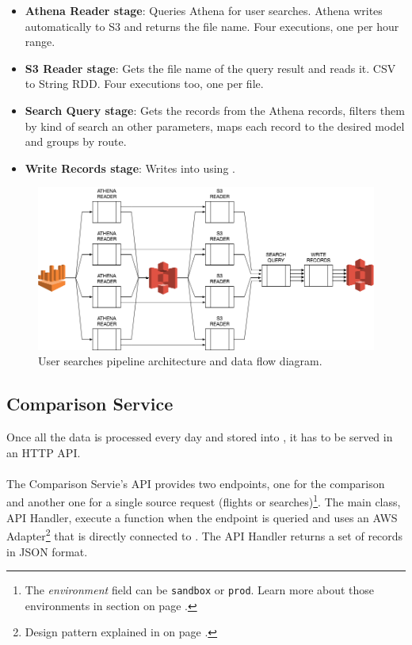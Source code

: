 \begin{itemize}
    \item \textbf{Athena Reader stage}: Queries Athena for user searches. Athena writes automatically to S3 and returns the file name. Four executions, one per hour range.
    \item \textbf{S3 Reader stage}: Gets the file name of the query result and reads it. CSV\cite{csv} to String RDD. Four executions too, one per file.
    \item \textbf{Search Query stage}: Gets the records from the Athena records, filters them by kind of search an other parameters, maps each record to the desired model and groups by route.
    \item \textbf{Write Records stage}: Writes into  using .
\end{itemize}

\begin{figure}[H]
\centering
\includegraphics[scale=0.45]{diagrams/user-searches-pipeline-architecture.png}
\caption{User searches pipeline architecture and data flow diagram.}
\end{figure}


\subsection{Comparison Service} \label{comparison_service}

Once all the data is processed every day and stored into , it has to be served in an HTTP\cite{http} API.
\\\\
The Comparison Servie's API provides two endpoints, one for the comparison and another one for a single source request (flights or searches)\footnote{The \textit{environment} field can be \texttt{sandbox} or \texttt{prod}. Learn more about those environments in section  on page \pageref{environments}.}. The main class, API Handler, execute a function when the endpoint is queried and uses an AWS Adapter\footnote{Design pattern explained in  on page \pageref{appendix_b}.} that is directly connected to . The API Handler returns a set of records in JSON format.

